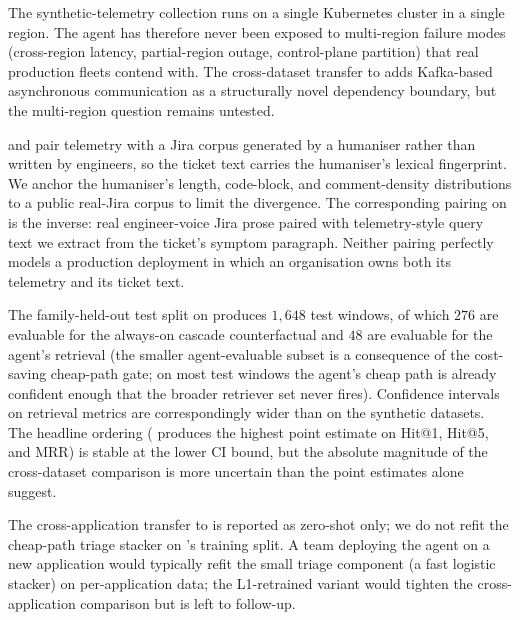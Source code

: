  The synthetic-telemetry collection runs on a single Kubernetes cluster in a single region. The agent has therefore never been exposed to multi-region failure modes (cross-region latency, partial-region outage, control-plane partition) that real production fleets contend with. The cross-dataset transfer to \dsotel{} adds Kafka-based asynchronous communication as a structurally novel dependency boundary, but the multi-region question remains untested.

 \dsob{} and \dsotel{} pair telemetry with a Jira corpus generated by a humaniser rather than written by engineers, so the ticket text carries the humaniser's lexical fingerprint. We anchor the humaniser's length, code-block, and comment-density distributions to a public real-Jira corpus to limit the divergence. The corresponding pairing on \dswol{} is the inverse: real engineer-voice Jira prose paired with telemetry-style query text we extract from the ticket's symptom paragraph. Neither pairing perfectly models a production deployment in which an organisation owns both its telemetry and its ticket text.

 The family-held-out test split on \dswol{} produces $1{,}648$ test windows, of which $276$ are evaluable for the always-on cascade counterfactual and $48$ are evaluable for the agent's retrieval (the smaller agent-evaluable subset is a consequence of the cost-saving cheap-path gate; on most test windows the agent's cheap path is already confident enough that the broader retriever set never fires). Confidence intervals on \dswol{} retrieval metrics are correspondingly wider than on the synthetic datasets. The headline ordering (\dswol{} produces the highest point estimate on Hit@1, Hit@5, and MRR) is stable at the lower CI bound, but the absolute magnitude of the cross-dataset comparison is more uncertain than the point estimates alone suggest.

 The cross-application transfer to \dsotel{} is reported as zero-shot only; we do not refit the cheap-path triage stacker on \dsotel{}'s training split. A team deploying the agent on a new application would typically refit the small triage component (a fast logistic stacker) on per-application data; the L1-retrained variant would tighten the cross-application comparison but is left to follow-up.

